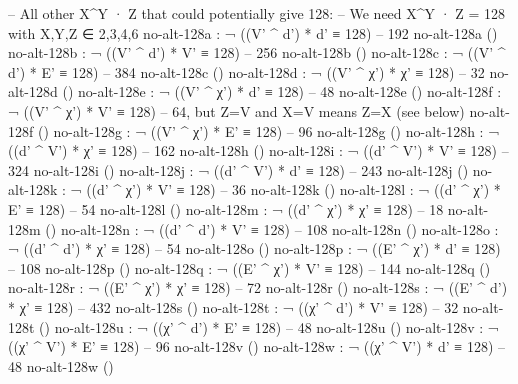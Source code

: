 \documentclass[11pt,a4paper]{article}
\begin{document}
\begin{code}
-- All other X^Y · Z that could potentially give 128:
-- We need X^Y · Z = 128 with X,Y,Z ∈ {2,3,4,6}
no-alt-128a : ¬ ((V' ^ d') * d' ≡ 128)    -- 192
no-alt-128a ()
no-alt-128b : ¬ ((V' ^ d') * V' ≡ 128)    -- 256
no-alt-128b ()
no-alt-128c : ¬ ((V' ^ d') * E' ≡ 128)    -- 384
no-alt-128c ()
no-alt-128d : ¬ ((V' ^ χ') * χ' ≡ 128)    -- 32
no-alt-128d ()
no-alt-128e : ¬ ((V' ^ χ') * d' ≡ 128)    -- 48
no-alt-128e ()
no-alt-128f : ¬ ((V' ^ χ') * V' ≡ 128)    -- 64, but Z=V and X=V means Z=X (see below)
no-alt-128f ()
no-alt-128g : ¬ ((V' ^ χ') * E' ≡ 128)    -- 96
no-alt-128g ()
no-alt-128h : ¬ ((d' ^ V') * χ' ≡ 128)    -- 162
no-alt-128h ()
no-alt-128i : ¬ ((d' ^ V') * V' ≡ 128)    -- 324
no-alt-128i ()
no-alt-128j : ¬ ((d' ^ V') * d' ≡ 128)    -- 243
no-alt-128j ()
no-alt-128k : ¬ ((d' ^ χ') * V' ≡ 128)    -- 36
no-alt-128k ()
no-alt-128l : ¬ ((d' ^ χ') * E' ≡ 128)    -- 54
no-alt-128l ()
no-alt-128m : ¬ ((d' ^ χ') * χ' ≡ 128)    -- 18
no-alt-128m ()
no-alt-128n : ¬ ((d' ^ d') * V' ≡ 128)    -- 108
no-alt-128n ()
no-alt-128o : ¬ ((d' ^ d') * χ' ≡ 128)    -- 54
no-alt-128o ()
no-alt-128p : ¬ ((E' ^ χ') * d' ≡ 128)    -- 108
no-alt-128p ()
no-alt-128q : ¬ ((E' ^ χ') * V' ≡ 128)    -- 144
no-alt-128q ()
no-alt-128r : ¬ ((E' ^ χ') * χ' ≡ 128)    -- 72
no-alt-128r ()
no-alt-128s : ¬ ((E' ^ d') * χ' ≡ 128)    -- 432
no-alt-128s ()
no-alt-128t : ¬ ((χ' ^ d') * V' ≡ 128)    -- 32
no-alt-128t ()
no-alt-128u : ¬ ((χ' ^ d') * E' ≡ 128)    -- 48
no-alt-128u ()
no-alt-128v : ¬ ((χ' ^ V') * E' ≡ 128)    -- 96
no-alt-128v ()
no-alt-128w : ¬ ((χ' ^ V') * d' ≡ 128)    -- 48
no-alt-128w ()


\end{code}
\end{document}
